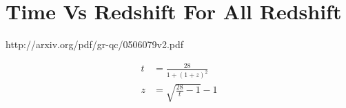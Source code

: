 \documentclass{article}
\begin{document}
\section{Time Vs Redshift For All Redshift}
http://arxiv.org/pdf/gr-qc/0506079v2.pdf

\begin{align}
	t &= \frac{28}{1+(1+z)^2} \\
	z &= \sqrt{\frac{28}{t}-1} -1
\end{align}
\begin{figure}[ht]
	\begin{center}
		
	\end{center}
\end{figure}
\begin{figure}[ht]
	\begin{center}
		
	\end{center}
\end{figure}
\end{document}
